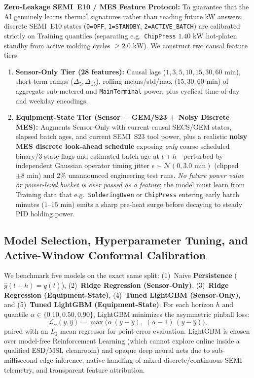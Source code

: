 \textbf{Zero-Leakage SEMI~E10 / MES Feature Protocol:} To guarantee that the AI genuinely learns thermal signatures rather than reading future kW answers, discrete SEMI~E10 states (\texttt{0=OFF}, \texttt{1=STANDBY}, \texttt{2=ACTIVE\_BATCH}) are calibrated strictly on Training quantiles (separating e.g.\ \texttt{ChipPress} $1.40\text{ kW}$ hot-platen standby from active molding cycles $\ge 2.0\text{ kW}$). We construct two causal feature tiers:
\begin{enumerate}
    \item \textbf{Sensor-Only Tier (28 features):} Causal lags ($1, 3, 5, 10, 15, 30, 60\text{ min}$), short-term ramps ($\Delta_5, \Delta_{15}$), rolling means/std/max ($15, 30, 60\text{ min}$) of aggregate sub-metered and \texttt{MainTerminal} power, plus cyclical time-of-day and weekday encodings.
    \item \textbf{Equipment-State Tier (Sensor + GEM/S23 + Noisy Discrete MES):} Augments Sensor-Only with current causal SECS/GEM states, elapsed batch ages, and current SEMI~S23 tool power, plus a realistic \textbf{noisy MES discrete look-ahead schedule} exposing \emph{only} coarse scheduled binary/3-state flags and estimated batch age at $t+h$---perturbed by independent Gaussian operator timing jitter $\epsilon \sim \mathcal{N}(0, 3.0\text{ min})$ (clipped $\pm 8\text{ min}$) and $2\%$ unannounced engineering test runs. \emph{No future power value or power-level bucket is ever passed as a feature}; the model must learn from Training data that e.g.\ \texttt{SolderingOven} or \texttt{ChipPress} entering early batch minutes ($1\text{--}15\text{ min}$) emits a sharp pre-heat surge before decaying to steady PID holding power.
\end{enumerate}

\subsection{Model Selection, Hyperparameter Tuning, and Active-Window Conformal Calibration}

We benchmark five models on the exact same split: (1)~Naive \textbf{Persistence} ($\hat{y}(t+h) = y(t)$), (2)~\textbf{Ridge Regression (Sensor-Only)}, (3)~\textbf{Ridge Regression (Equipment-State)}, (4)~\textbf{Tuned LightGBM (Sensor-Only)}, and (5)~\textbf{Tuned LightGBM (Equipment-State)}. For each horizon $h$ and quantile $\alpha \in \{0.10, 0.50, 0.90\}$, LightGBM minimizes the asymmetric pinball loss:
\begin{equation}
\mathcal{L}_{\alpha}\!\left(y, \hat{y}\right) = \max\!\Big(\alpha\,(y - \hat{y}),\; (\alpha - 1)\,(y - \hat{y})\Big),
\label{eq:pinball}
\end{equation}
paired with an $L_2$ mean regressor for point-error evaluation. LightGBM is chosen over model-free Reinforcement Learning (which cannot explore online inside a qualified ESD/MSL cleanroom) and opaque deep neural nets due to sub-millisecond edge inference, native handling of mixed discrete/continuous SEMI telemetry, and transparent feature attribution.


